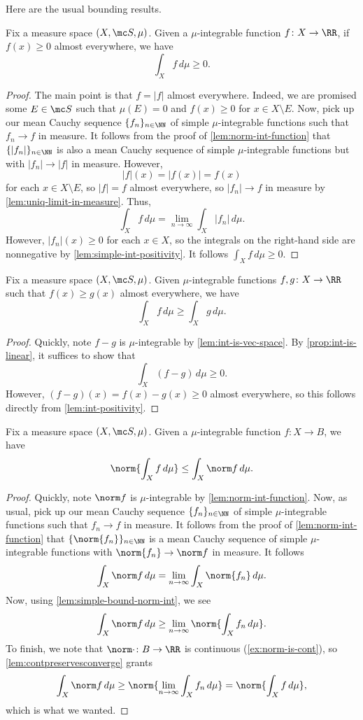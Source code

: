 \documentclass[../notes.tex]{subfiles}
\begin{document}
Here are the usual bounding results.
\begin{lemma} \label{lem:int-positivity}
	Fix a measure space $(X,\mc S,\mu)$. Given a $\mu$-integrable function $f\colon X\to\RR$, if $f(x)\ge0$ almost everywhere, we have
	\[\int_Xf\,d\mu\ge0.\]
\end{lemma}
\begin{proof}
	The main point is that $f=|f|$ almost everywhere. Indeed, we are promised some $E\in\mc S$ such that $\mu(E)=0$ and $f(x)\ge0$ for $x\in X\setminus E$. Now, pick up our mean Cauchy sequence $\{f_n\}_{n\in\NN}$ of simple $\mu$-integrable functions such that $f_n\to f$ in measure. It follows from the proof of \autoref{lem:norm-int-function} that $\{|f_n|\}_{n\in\NN}$ is also a mean Cauchy sequence of simple $\mu$-integrable functions but with $|f_n|\to|f|$ in measure. However,
	\[|f|(x)=|f(x)|=f(x)\]
	for each $x\in X\setminus E$, so $|f|=f$ almost everywhere, so $|f_n|\to f$ in measure by \autoref{lem:uniq-limit-in-measure}. Thus,
	\[\int_Xf\,d\mu=\lim_{n\to\infty}\int_X|f_n|\,d\mu.\]
	However, $|f_n|(x)\ge0$ for each $x\in X$, so the integrals on the right-hand side are nonnegative by \autoref{lem:simple-int-positivity}. It follows $\int_Xf\,d\mu\ge0$.
\end{proof}
\begin{lemma} \label{lem:bound-ints}
	Fix a measure space $(X,\mc S,\mu)$. Given $\mu$-integrable functions $f,g\colon X\to\RR$ such that $f(x)\ge g(x)$ almost everywhere, we have
	\[\int_Xf\,d\mu\ge\int_Xg\,d\mu.\]
\end{lemma}
\begin{proof}
	Quickly, note $f-g$ is $\mu$-integrable by \autoref{lem:int-is-vec-space}. By \autoref{prop:int-is-linear}, it suffices to show that
	\[\int_X(f-g)\,d\mu\ge0.\]
	However, $(f-g)(x)=f(x)-g(x)\ge0$ almost everywhere, so this follows directly from \autoref{lem:int-positivity}.
\end{proof}
\begin{lemma} \label{lem:bound-norm-int}
	Fix a measure space $(X,\mc S,\mu)$. Given a $\mu$-integrable function $f\colon X\to B$, we have
	\[\norm{\int_Xf\,d\mu}\le\int_X\norm f\,d\mu.\]
\end{lemma}
\begin{proof}
	Quickly, note $\norm f$ is $\mu$-integrable by \autoref{lem:norm-int-function}. Now, as usual, pick up our mean Cauchy sequence $\{f_n\}_{n\in\NN}$ of simple $\mu$-integrable functions such that $f_n\to f$ in measure. It follows from the proof of \autoref{lem:norm-int-function} that $\{\norm{f_n}\}_{n\in\NN}$ is a mean Cauchy sequence of simple $\mu$-integrable functions with $\norm{f_n}\to\norm f$ in measure. It follows
	\[\int_X\norm f\,d\mu=\lim_{n\to\infty}\int_X\norm{f_n}\,d\mu.\]
	Now, using \autoref{lem:simple-bound-norm-int}, we see
	\[\int_X\norm f\,d\mu\ge\lim_{n\to\infty}\norm{\int_Xf_n\,d\mu}.\]
	To finish, we note that $\norm\cdot\colon B\to\RR$ is continuous (\autoref{ex:norm-is-cont}), so \autoref{lem:contpreservesconverge} grants
	\[\int_X\norm f\,d\mu\ge\norm{\lim_{n\to\infty}\int_Xf_n\,d\mu}=\norm{\int_Xf\,d\mu},\]
	which is what we wanted.
\end{proof}
\end{document}

